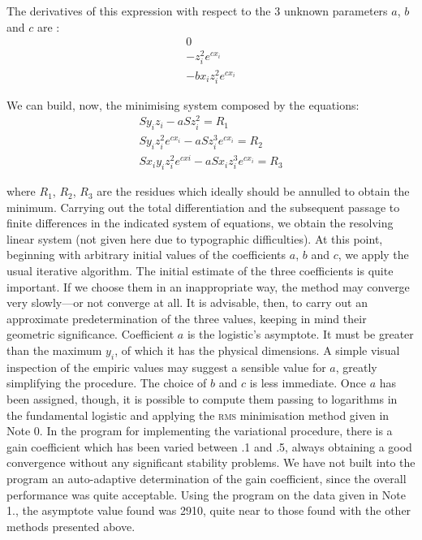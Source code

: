 \documentclass[%
 aip,
 jmp,%
 amsmath,amssymb,
 reprint,%
]{revtex4-1}
\begin{document}
The derivatives of this expression with respect to the 3 unknown parameters $a$, $b$ and $c$ are :
\begin{eqnarray*}
0  \\
-z_i^2 e^{c x_i} \\
-b x_i z_i^2 e^{c x_i}
\end{eqnarray*}

We can build, now, the minimising system composed by the equations:
\begin{eqnarray*}
	S y_i z_i - a S z_i^2 = R_1 \\
	S y_i z_i^2 e^{c x_i} - a S z_i^3 e^{c x_i} = R_2 \\
	S x_i y_i z_i^2 e^{c xi} - a S x_i z_i^3 e^{c x_i} = R_3
\end{eqnarray*}

where $R_1$, $R_2$, $R_3$ are the residues which ideally should be annulled to obtain the minimum.
Carrying out the total differentiation and the subsequent passage to finite differences in the indicated  system of equations, we obtain  the resolving linear  system (not  given here due to typographic difficulties). At this point, beginning with arbitrary initial values of the coefficients $a$, $b$ and $c$, we apply the usual iterative algorithm. The initial estimate of the three coefficients is quite important. If we choose them in an inappropriate way, the method may converge very slowly---or not converge at all.
It is advisable, then, to carry out an approximate predetermination  of the  three  values,  keeping  in  mind  their  geometric   significance. Coefficient $a$ is the logistic's asymptote. It must be greater than the maximum  $y_i$, of which it has the physical dimensions. A simple visual inspection of the empiric values may suggest a  sensible value for $a$, greatly simplifying the procedure.
The choice of $b$ and $c$ is less immediate. Once $a$ has been assigned, though, it is possible to compute them passing to logarithms in the fundamental logistic and applying the \textsc{rms} minimisation method given in Note 0.
In the program for implementing the variational procedure, there is a gain coefficient which has been varied between .1 and .5, always obtaining a good convergence without any significant stability problems. We have not built into the program an auto-adaptive determination of the gain coefficient, since the overall performance was quite acceptable. Using the program on the data given in Note 1., the asymptote value found was 2910, quite near  to those found with the other methods presented above.
\end{document}

